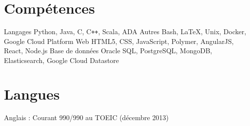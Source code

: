 \documentclass[11pt,a4paper,sans]{moderncv} %
\begin{document}




\section{Compétences}

\cvdoubleitem
    {Langages}
    {Python, Java, C, C\texttt{++}, Scala, ADA}
    {Autres}
    {Bash, \LaTeX, Unix, Docker, Google Cloud Platform}
\cvdoubleitem
    {Web}
    {HTML5, CSS, JavaScript, Polymer, AngularJS, React, Node.js}
    {Base de données}
    {Oracle SQL, PostgreSQL, MongoDB, Elasticsearch, Google Cloud Datastore}



\section{Langues}

\cvitemwithcomment
    {}
    {Anglais : Courant}
    {990/990 au TOEIC (décembre 2013)}
\end{document}
